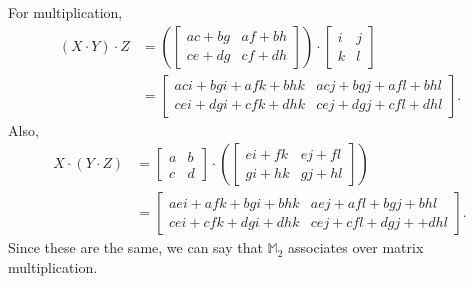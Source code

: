 \begin{enumerate}[(a)]
\begin{enumerate}[(1)]
For multiplication,
\begin{align*}
(X\cdot Y)\cdot Z&=\left(
\begin{bmatrix}
ac+bg & af+bh\\
ce+dg & cf+dh
\end{bmatrix}
\right)\cdot
\begin{bmatrix}
i & j\\
k & l
\end{bmatrix}\\
&=
\begin{bmatrix}
aci+bgi+afk+bhk & acj+bgj+afl+bhl\\
cei+dgi+cfk+dhk & cej+dgj+cfl+dhl
\end{bmatrix}.
\end{align*}
Also, 
\begin{align*}
X\cdot(Y\cdot Z)&=
\begin{bmatrix}
a & b\\
c & d
\end{bmatrix}
\cdot\left(
\begin{bmatrix}
ei+fk & ej+fl\\
gi+hk & gj+hl
\end{bmatrix}
\right)\\
&=
\begin{bmatrix}
aei+afk+bgi+bhk & aej+afl+bgj+bhl\\
cei+cfk+dgi+dhk & cej+cfl+dgj++dhl
\end{bmatrix}.
\end{align*}
Since these are the same, we can say that ${\mathbb M}_2$ associates over matrix multiplication.


\end{enumerate}
\end{enumerate}
